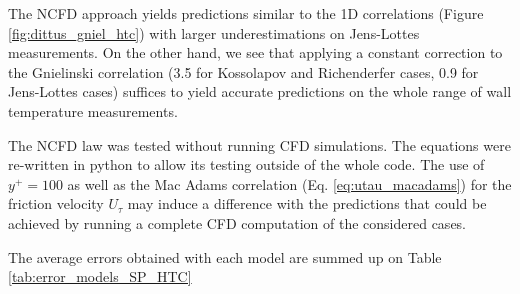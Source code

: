 The NCFD approach yields predictions similar to the 1D correlations (Figure \ref{fig:dittus_gniel_htc}) with larger underestimations on Jens-Lottes measurements. On the other hand, we see that applying a constant correction to the Gnielinski correlation (3.5 for Kossolapov and Richenderfer cases, 0.9 for Jens-Lottes cases) suffices to yield accurate predictions on the whole range of wall temperature measurements. 

\begin{remark*}{}
The NCFD law was tested without running CFD simulations. The equations were re-written in python to allow its testing outside of the whole code. The use of $y^{+}=100$ as well as the Mac Adams correlation (Eq. \ref{eq:utau_macadams}) for the friction velocity $U_{\tau}$ may induce a difference with the predictions that could be achieved by running a complete CFD computation of the considered cases.
\end{remark*}

The average errors obtained with each model are summed up on Table \ref{tab:error_models_SP_HTC}

\begin{table}[h!]


\noindent{}
\caption{Average errors achieved by the considered models on each data sets.}
\label{tab:error_models_SP_HTC}
\end{table}


